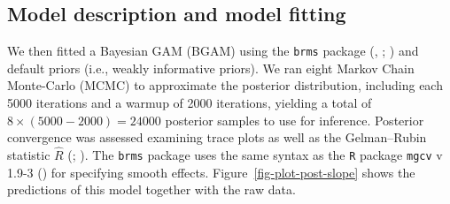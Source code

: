 \documentclass[
  doc,
  floatsintext,
  longtable,
  a4paper,
  nolmodern,
  notxfonts,
  notimes,
  donotrepeattitle,
  colorlinks=true,linkcolor=blue,citecolor=blue,urlcolor=blue]{apa7}
\newenvironment{Shaded}{\begin{snugshade}}{\end{snugshade}}
\newcommand{\AttributeTok}[1]{\textcolor[rgb]{0.40,0.45,0.13}{#1}}
\newcommand{\CommentTok}[1]{\textcolor[rgb]{0.37,0.37,0.37}{#1}}
\newcommand{\DecValTok}[1]{\textcolor[rgb]{0.68,0.00,0.00}{#1}}
\newcommand{\FloatTok}[1]{\textcolor[rgb]{0.68,0.00,0.00}{#1}}
\newcommand{\FunctionTok}[1]{\textcolor[rgb]{0.28,0.35,0.67}{#1}}
\newcommand{\NormalTok}[1]{\textcolor[rgb]{0.00,0.23,0.31}{#1}}
\newcommand{\OtherTok}[1]{\textcolor[rgb]{0.00,0.23,0.31}{#1}}
\newcommand{\SpecialCharTok}[1]{\textcolor[rgb]{0.37,0.37,0.37}{#1}}
\newcommand{\StringTok}[1]{\textcolor[rgb]{0.13,0.47,0.30}{#1}}
\begin{document}
\subsection{Model description and model
fitting}\label{model-description-and-model-fitting}

We then fitted a Bayesian GAM (BGAM) using the \texttt{brms} package
(, ;
) and default
priors (i.e., weakly informative priors). We ran eight Markov Chain
Monte-Carlo (MCMC) to approximate the posterior distribution, including
each 5000 iterations and a warmup of 2000 iterations, yielding a total
of \(8 \times (5000-2000) = 24000\) posterior samples to use for
inference. Posterior convergence was assessed examining trace plots as
well as the Gelman--Rubin statistic \(\hat{R}\)
(;
). The \texttt{brms}
package uses the same syntax as the \texttt{R} package \texttt{mgcv} v
1.9-3 () for specifying smooth effects.
Figure~\ref{fig-plot-post-slope} shows the predictions of this model
together with the raw data.

\begin{Shaded}
\end{Shaded}
\end{document}
